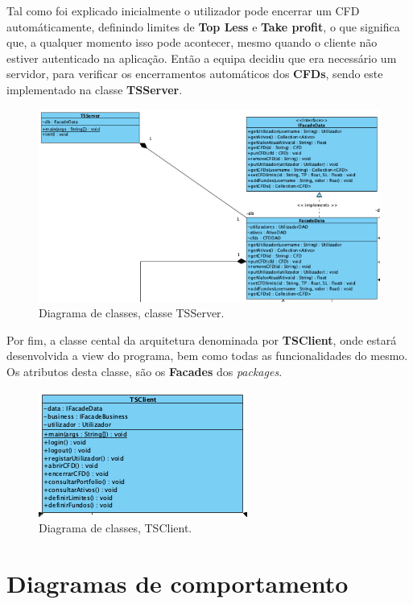 \documentclass[11pt,a4paper]{report}%
\begin{document}
Tal como foi explicado inicialmente o utilizador pode encerrar um CFD automáticamente, definindo limites de \textbf{Top Less} e \textbf{Take profit}, o que significa que, a qualquer momento isso pode acontecer, mesmo quando o cliente não estiver autenticado na aplicação. Então a equipa decidiu que era necessário um servidor, para verificar os encerramentos automáticos dos \textbf{CFDs}, sendo este implementado na classe \textbf{TSServer}.

\begin{figure}[H]
	\centering
	\includegraphics[scale=0.5]{diagrama-classes-5.png}
	\caption{Diagrama de classes, classe TSServer. }
	\label{img:pag}
\end{figure}

Por fim, a classe cental da arquitetura denominada por \textbf{TSClient}, onde estará desenvolvida a view do programa, bem como todas as funcionalidades do mesmo. Os atributos desta classe, são os \textbf{Facades} dos \emph{packages}.

\begin{figure}[H]
	\centering
	\includegraphics[scale=0.5]{diagrama-classes-6.png}
	\caption{Diagrama de classes, TSClient. }
	\label{img:pag}
\end{figure}

\newpage

\section{Diagramas de comportamento}
\end{document}

